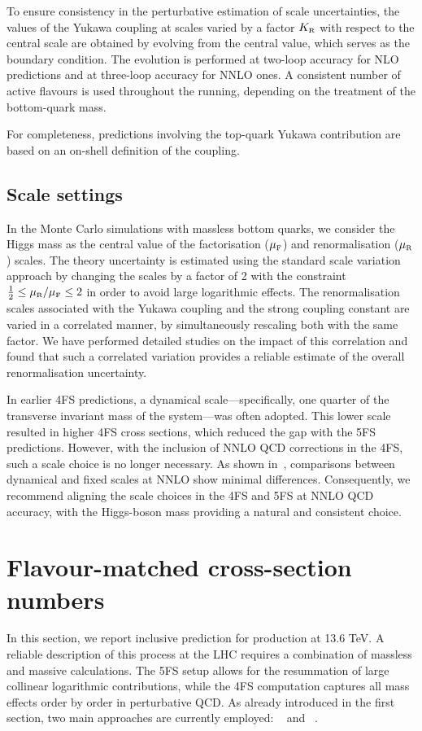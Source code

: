 \documentclass[11pt,a4paper]{article}
\begin{document}
To ensure consistency in the perturbative estimation of scale uncertainties, the values of the Yukawa coupling at scales varied by a factor $\KR$ with respect to the central scale are obtained by evolving from the central value, which serves as the boundary condition. The evolution is performed at two-loop accuracy for NLO predictions and at three-loop accuracy for NNLO ones. A consistent number of active flavours is used throughout the running, depending on the treatment of the bottom-quark mass.

For completeness, predictions involving the top-quark Yukawa contribution are based on an on-shell definition of the coupling.

\subsection{Scale settings}
In the Monte Carlo simulations with massless bottom quarks, we consider the Higgs mass as the central value of the factorisation ($\muF$) and renormalisation ($\muR$) scales. The theory uncertainty is estimated using the standard scale variation approach by changing the scales by a factor of 2 with the constraint $\frac{1}{2}\leq\muR/\muF\leq 2$ in order to avoid large logarithmic effects. The renormalisation scales associated with the Yukawa coupling and the strong coupling constant are varied in a correlated manner, by simultaneously rescaling both with the same factor. We have performed detailed studies on the impact of this correlation and found that such a correlated variation provides a reliable estimate of the overall renormalisation uncertainty.

In earlier 4FS predictions, a dynamical scale—specifically, one quarter of the transverse invariant mass of the \bbH{} system—was often adopted. This lower scale resulted in higher 4FS cross sections, which reduced the gap with the 5FS predictions. However, with the inclusion of NNLO QCD corrections in the 4FS, such a scale choice is no longer necessary. As shown in~, comparisons between dynamical and fixed scales at NNLO show minimal differences. Consequently, we recommend aligning the scale choices in the 4FS and 5FS at NNLO QCD accuracy, with the Higgs-boson mass providing a natural and consistent choice.

\section{Flavour-matched cross-section numbers}
In this section, we report inclusive prediction for \bbH{} production at 13.6 TeV. A reliable description of this process at the LHC requires a combination of massless and massive calculations. The 5FS setup allows for the resummation of large collinear logarithmic contributions, while the 4FS computation captures all mass effects order by order in perturbative QCD. As already introduced in the first section, two main approaches are currently employed: \fonll{}~\cite{forte:2015hba,forte:2016sja,Duhr:2020kzd} and \nlonnllpart{}~\cite{Bonvini:2015pxa,Bonvini:2016fgf}. 
\end{document}

